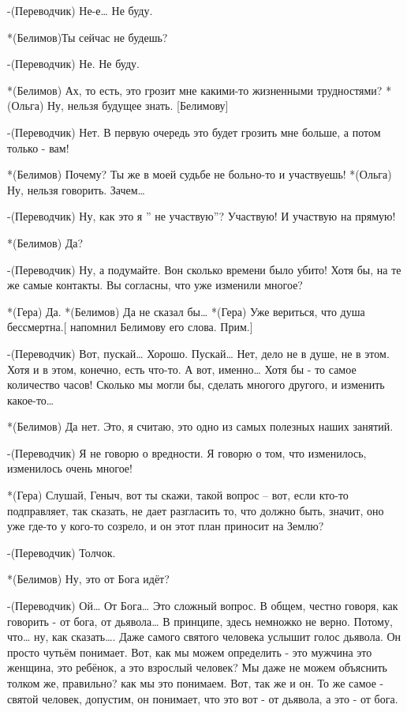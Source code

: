 -(Переводчик) Не-е… Не буду.

*(Белимов)Ты сейчас не будешь?

-(Переводчик) Не. Не буду.

*(Белимов) Ах, то есть, это грозит мне какими-то жизненными трудностями?
*(Ольга) Ну, нельзя будущее знать. [Белимову]

-(Переводчик) Нет. В первую очередь это будет грозить мне больше, а потом только - вам!

*(Белимов) Почему? Ты же в моей судьбе не больно-то и участвуешь!
*(Ольга) Ну, нельзя говорить. Зачем…

-(Переводчик) Ну, как это я ” не участвую”? Участвую! И участвую на прямую!

*(Белимов) Да?

-(Переводчик) Ну, а подумайте. Вон сколько времени было убито! Хотя бы, на те же самые контакты. Вы согласны, что уже изменили многое?

*(Гера) Да.
*(Белимов) Да не сказал бы…
*(Гера) Уже вериться, что душа бессмертна.[ напомнил Белимову его слова. Прим.]

-(Переводчик) Вот, пускай… Хорошо. Пускай… Нет, дело не в душе, не в этом. Хотя и в этом, конечно, есть что-то. А вот, именно… Хотя бы - то самое количество часов! Сколько мы могли бы, сделать многого другого, и изменить какое-то…

*(Белимов) Да нет. Это, я считаю, это одно из самых полезных наших занятий.

-(Переводчик) Я не говорю о вредности. Я говорю о том, что изменилось, изменилось очень многое!

*(Гера) Слушай, Геныч, вот ты скажи, такой вопрос – вот, если кто-то подправляет, так сказать, не дает разгласить то, что должно быть, значит, оно уже где-то у кого-то созрело, и он этот план приносит на Землю?

-(Переводчик) Толчок. 

*(Белимов) Ну, это от Бога идёт?

-(Переводчик) Ой… От Бога… Это сложный вопрос. В общем, честно говоря, как говорить - от бога, от дьявола… В принципе, здесь немножко не верно. Потому, что… ну, как сказать…. Даже самого святого человека услышит голос дьявола. Он просто чутьём понимает. Вот, как мы можем определить - это мужчина это женщина, это ребёнок, а это взрослый человек? Мы даже не можем объяснить толком же, правильно? как мы это понимаем. Вот, так же и он. То же самое - святой человек, допустим, он понимает, что это вот - от дьявола, а это - от бога. 

